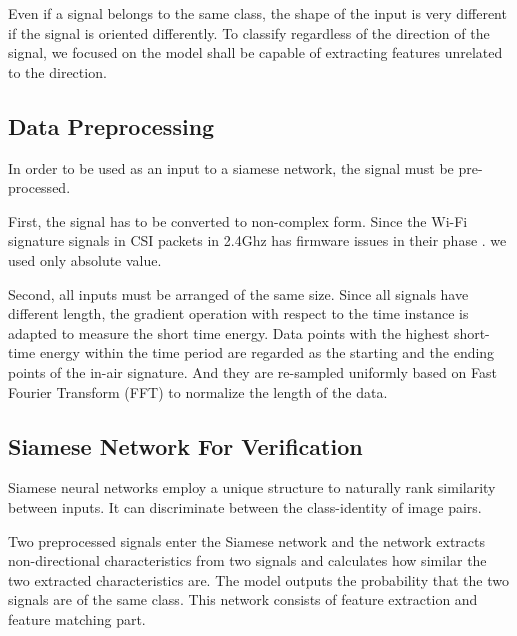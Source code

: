 \documentclass[runningheads]{llncs}
\begin{document}
Even if a signal belongs to the same class, the shape of the input is very different if the signal is oriented differently.
To classify regardless of the direction of the signal, we focused on the model shall be capable of extracting features unrelated to the direction.

\subsection{Data Preprocessing}

In order to be used as an input to a siamese network, the signal must be pre-processed.

First, the signal has to be converted to non-complex form.
Since the Wi-Fi signature signals in CSI packets in 2.4Ghz has firmware issues in their phase \cite{wang2015understanding}. we used only absolute value.

Second, all inputs must be arranged of the same size.
Since all signals have different length, the gradient operation with respect to the time instance is adapted to measure the short time energy. 
Data points with the highest short-time energy within the time period are regarded as the starting and the ending points of the in-air signature.
And they are re-sampled uniformly based on Fast Fourier Transform (FFT)  to normalize the length of the data. \cite{moon2017air}%


\subsection{Siamese Network For Verification}


Siamese neural networks employ a unique structure to naturally rank similarity between inputs. It can discriminate between the class-identity of image pairs.
\cite{koch2015siamese}

Two preprocessed signals enter the Siamese network and the network extracts non-directional characteristics from two signals and calculates how similar the two extracted characteristics are. The model outputs the probability that the two signals are of the same class. %
This network consists of feature extraction and feature matching part.

\end{document}
